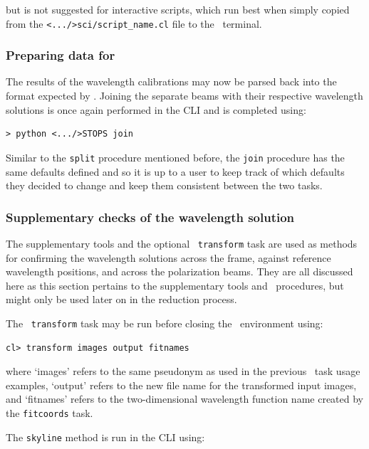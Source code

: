 \noindent but is not suggested for interactive scripts, which run best when simply copied from the \texttt{<.../>sci/script\_name.cl} file to the \iraf\ terminal.


\subsubsection{Preparing data for \polsalt}

The results of the wavelength calibrations may now be parsed back into the format expected by \polsalt. Joining the separate beams with their respective wavelength solutions is once again performed in the \gls{CLI} and is completed using:

\begin{verbatim}> python <.../>STOPS join\end{verbatim}

Similar to the \texttt{split} procedure mentioned before, the \texttt{join} procedure has the same defaults defined and so it is up to a user to keep track of which defaults they decided to change and keep them consistent between the two tasks.


\subsubsection{Supplementary checks of the wavelength solution}

The supplementary tools and the optional \iraf\ \texttt{transform} task are used as methods for confirming the wavelength solutions across the frame, against reference wavelength positions, and across the polarization beams. They are all discussed here as this section pertains to the supplementary tools and \iraf\ procedures, but might only be used later on in the reduction process.

The \iraf\ \texttt{transform} task may be run before closing the \iraf\ environment using:

\begin{verbatim}cl> transform images output fitnames\end{verbatim}

\noindent where `images' refers to the same pseudonym as used in the previous \iraf\ task usage examples, `output' refers to the new file name for the transformed input images, and `fitnames' refers to the two-dimensional wavelength function name created by the \texttt{fitcoords} task.

The \texttt{skyline} method is run in the \gls{CLI} using:

